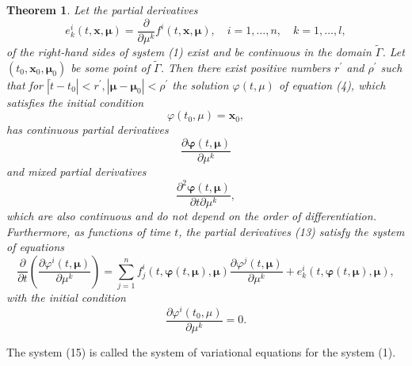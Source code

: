 \documentclass[10pt,a5paper]{book}
\theoremstyle{plain}
\newtheorem{theorem}{Theorem}
\theoremstyle{definition}
\theoremstyle{remark}
\begin{document}
\begin{theorem}
Let the partial derivatives
\begin{equation*}
e_{k}^{i}(t, \mathbf{x}, \boldsymbol{\mu})=\frac{\partial}{\partial \mu^{k}} f^{i}(t, \mathbf{x}, \boldsymbol{\mu}), \quad i=1, \ldots, n, \quad k=1, \ldots, l, \tag{11}
\end{equation*}
of the right-hand sides of system (1) exist and be continuous in the domain $\widetilde{\Gamma}$. Let $\left(t_{0}, \mathbf{x}_{0}, \boldsymbol{\mu}_{0}\right)$ be some point of $\widetilde{\Gamma}$. Then there exist positive numbers $r^{\prime}$ and $\rho^{\prime}$ such that for $\left|\dot{t}-t_{0}\right|<r^{\prime},\left|\boldsymbol{\mu}-\boldsymbol{\mu}_{0}\right|<\rho^{\prime}$ the solution $\varphi(t, \mu)$ of equation (4), which satisfies the initial condition
\begin{equation*}
\varphi\left(t_{0}, \mu\right)=\mathbf{x}_{0}, \tag{12}
\end{equation*}
has continuous partial derivatives
\begin{equation*}
\frac{\partial \boldsymbol{\varphi}(t, \boldsymbol{\mu})}{\partial \mu^{k}} \tag{13}
\end{equation*}
and mixed partial derivatives
\begin{equation*}
\frac{\partial^{2} \boldsymbol{\varphi}(t, \boldsymbol{\mu})}{\partial t \partial \mu^{k}}, \tag{14}
\end{equation*}
which are also continuous and do not depend on the order of differentiation. Furthermore, as functions of time $t$, the partial derivatives (13) satisfy the system of equations
\begin{equation*}
\frac{\partial}{\partial t}\left(\frac{\partial \varphi^{i}(t, \boldsymbol{\mu})}{\partial \mu^{k}}\right)=\sum_{j=1}^{n} f_{j}^{i}(t, \boldsymbol{\varphi}(t, \boldsymbol{\mu}), \boldsymbol{\mu}) \frac{\partial \varphi^{j}(t, \boldsymbol{\mu})}{\partial \mu^{k}}+e_{k}^{i}(t, \boldsymbol{\varphi}(t, \boldsymbol{\mu}), \boldsymbol{\mu}), \tag{15}
\end{equation*}
with the initial condition
\begin{equation*}
\frac{\partial \varphi^{i}\left(t_{0}, \mu\right)}{\partial \mu^{k}}=0 . \tag{16}
\end{equation*}
\end{theorem}

The system (15) is called the system of variational equations for the system (1).
\end{document}
